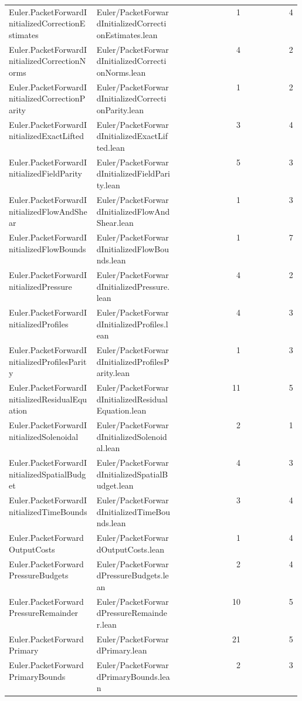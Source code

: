 \begin{longtable}{p{0.30\linewidth}p{0.28\linewidth}rr}
Euler.PacketForwardInitializedCorrectionEstimates & Euler/PacketForwardInitializedCorrectionEstimates.lean & 1 & 4\\
Euler.PacketForwardInitializedCorrectionNorms & Euler/PacketForwardInitializedCorrectionNorms.lean & 4 & 2\\
Euler.PacketForwardInitializedCorrectionParity & Euler/PacketForwardInitializedCorrectionParity.lean & 1 & 2\\
Euler.PacketForwardInitializedExactLifted & Euler/PacketForwardInitializedExactLifted.lean & 3 & 4\\
Euler.PacketForwardInitializedFieldParity & Euler/PacketForwardInitializedFieldParity.lean & 5 & 3\\
Euler.PacketForwardInitializedFlowAndShear & Euler/PacketForwardInitializedFlowAndShear.lean & 1 & 3\\
Euler.PacketForwardInitializedFlowBounds & Euler/PacketForwardInitializedFlowBounds.lean & 1 & 7\\
Euler.PacketForwardInitializedPressure & Euler/PacketForwardInitializedPressure.lean & 4 & 2\\
Euler.PacketForwardInitializedProfiles & Euler/PacketForwardInitializedProfiles.lean & 4 & 3\\
Euler.PacketForwardInitializedProfilesParity & Euler/PacketForwardInitializedProfilesParity.lean & 1 & 3\\
Euler.PacketForwardInitializedResidualEquation & Euler/PacketForwardInitializedResidualEquation.lean & 11 & 5\\
Euler.PacketForwardInitializedSolenoidal & Euler/PacketForwardInitializedSolenoidal.lean & 2 & 1\\
Euler.PacketForwardInitializedSpatialBudget & Euler/PacketForwardInitializedSpatialBudget.lean & 4 & 3\\
Euler.PacketForwardInitializedTimeBounds & Euler/PacketForwardInitializedTimeBounds.lean & 3 & 4\\
Euler.PacketForwardOutputCosts & Euler/PacketForwardOutputCosts.lean & 1 & 4\\
Euler.PacketForwardPressureBudgets & Euler/PacketForwardPressureBudgets.lean & 2 & 4\\
Euler.PacketForwardPressureRemainder & Euler/PacketForwardPressureRemainder.lean & 10 & 5\\
Euler.PacketForwardPrimary & Euler/PacketForwardPrimary.lean & 21 & 5\\
Euler.PacketForwardPrimaryBounds & Euler/PacketForwardPrimaryBounds.lean & 2 & 3\\

\end{longtable}
